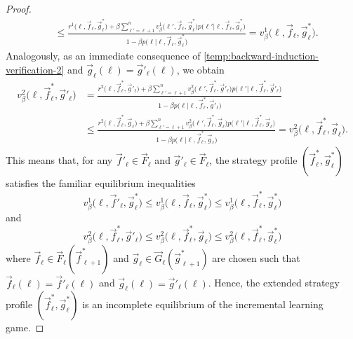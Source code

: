 \begin{proof}
\begin{equation}
\begin{split}
                & \le \frac{r^1\big(\ell, \vec{f}_\ell, \vec{g}^*_\ell\big) + \beta \sum_{\ell' = \ell + 1}^n v^1_\beta\big(\ell', \vec{f}_\ell, \vec{g}^*_\ell\big) p\big(\ell' \big| \ell, \vec{f}_\ell, \vec{g}^*_\ell\big)}{1 - \beta p\big(\ell \big| \ell, \vec{f}_\ell, \vec{g}^*_\ell\big)}
                = v^1_\beta\big(\ell, \vec{f}_\ell, \vec{g}^*_\ell\big).
        \end{split}
        \end{equation}
        Analogously, as an immediate consequence of \eqref{temp:backward-induction-verification-2} and $\vec{g}_\ell(\ell) = \vec{g}'_\ell(\ell)$, we obtain
        \begin{equation}  \label{temp:backward-induction-verification-4}
        \begin{split}
            v^2_\beta\big(\ell, \vec{f}^*_\ell, \vec{g}'_\ell\big)
                & = \frac{r^2\big(\ell, \vec{f}^*_\ell, \vec{g}'_\ell\big) + \beta \sum_{\ell' = \ell + 1}^n v^2_\beta\big(\ell', \vec{f}^*_\ell, \vec{g}'_\ell\big) p\big(\ell' \big| \ell, \vec{f}^*_\ell, \vec{g}'_\ell\big)}{1 - \beta p\big(\ell \big| \ell, \vec{f}^*_\ell, \vec{g}'_\ell\big)} \\
                & \le \frac{r^2\big(\ell, \vec{f}^*_\ell, \vec{g}_\ell\big) + \beta \sum_{\ell' = \ell + 1}^n v^2_\beta\big(\ell', \vec{f}^*_\ell, \vec{g}_\ell\big) p\big(\ell' \big| \ell, \vec{f}^*_\ell, \vec{g}_\ell\big)}{1 - \beta p\big(\ell \big| \ell, \vec{f}^*_\ell, \vec{g}_\ell\big)}
                = v^2_\beta\big(\ell, \vec{f}^*_\ell, \vec{g}_\ell\big).
        \end{split}
        \end{equation}
        This means that, for any $\vec{f}'_\ell \in \vec{F}_\ell$ and $\vec{g}'_\ell \in \vec{F}_\ell$, the strategy profile $(\vec{f}^*_\ell, \vec{g}^*_\ell)$ satisfies the familiar equilibrium inequalities
        \begin{equation}  \label{temp:backward-induction-verification-5}
            v^1_\beta\big(\ell, \vec{f}'_\ell, \vec{g}^*_\ell\big)
                \le v^1_\beta\big(\ell, \vec{f}_\ell, \vec{g}^*_\ell\big)
                \le v^1_\beta\big(\ell, \vec{f}^*_\ell, \vec{g}^*_\ell\big)
        \end{equation}
        and
        \begin{equation}  \label{temp:backward-induction-verification-6}
            v^2_\beta\big(\ell, \vec{f}^*_\ell, \vec{g}'_\ell\big)
                \le v^2_\beta\big(\ell, \vec{f}^*_\ell, \vec{g}_\ell\big)
                \le v^2_\beta\big(\ell, \vec{f}^*_\ell, \vec{g}^*_\ell\big)
        \end{equation}
        where $\vec{f}_\ell \in \vec{F}_\ell(\vec{f}^*_{\ell + 1})$ and $\vec{g}_\ell \in \vec{G}_\ell(\vec{g}^*_{\ell + 1})$ are chosen such that $\vec{f}_\ell(\ell) = \vec{f}'_\ell(\ell)$ and $\vec{g}_\ell(\ell) = \vec{g}'_\ell(\ell)$.
        Hence, the extended strategy profile $(\vec{f}^*_\ell, \vec{g}^*_\ell)$ is an incomplete equilibrium of the incremental learning game.


\end{proof}
